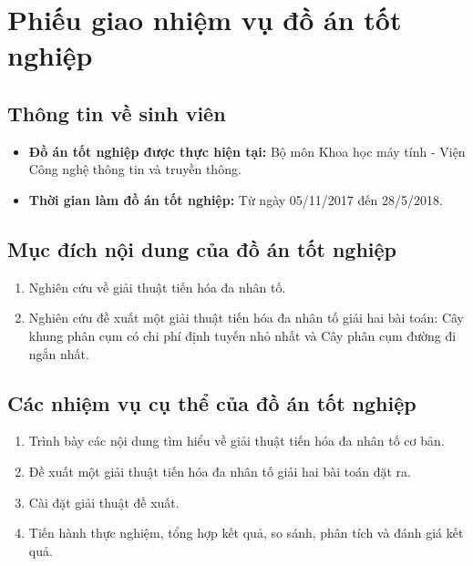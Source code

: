 

\chapter*{Phiếu giao nhiệm vụ đồ án tốt nghiệp}
\section*{Thông tin về sinh viên}

\begin{itemize}
\item \textbf{Đồ án tốt nghiệp được thực hiện tại:} Bộ môn Khoa học máy tính - Viện Công nghệ thông tin và truyền thông.
\item \textbf{Thời gian làm đồ án tốt nghiệp:} Từ ngày 05/11/2017 đến 28/5/2018.
\end{itemize}
\section*{Mục đích nội dung của đồ án tốt nghiệp}
\begin{enumerate}
	\item Nghiên cứu về giải thuật tiến hóa đa nhân tố.
	\item Nghiên cứu đề xuất một giải thuật tiến hóa đa nhân tố giải hai bài toán: Cây khung phân cụm có chi phí định tuyến nhỏ nhất và Cây phân cụm đường đi ngắn nhất.
\end{enumerate}

\section*{Các nhiệm vụ cụ thể của đồ án tốt nghiệp}
\begin{enumerate}
\item Trình bày các nội dung tìm hiểu về giải thuật tiến hóa đa nhân tố cơ bản.
\item Đề xuất một giải thuật tiến hóa đa nhân tố giải hai bài toán đặt ra.
\item Cài đặt giải thuật đề xuất.
\item Tiến hành thực nghiệm, tổng hợp kết quả, so sánh, phân tích và đánh giá kết quả.
\end{enumerate}
